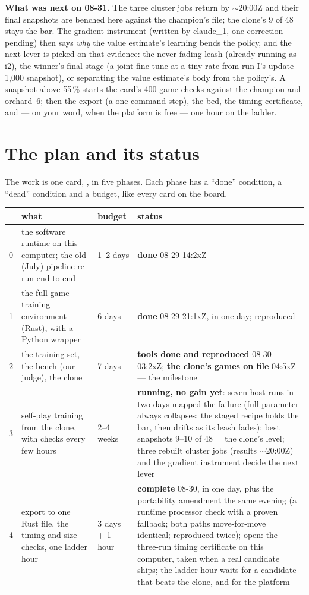 \documentclass[11pt,a4paper]{article}
\newcommand{\fp}[1]{{\small\path{#1}}}
\begin{document}
\textbf{What was next on 08-31.} The three cluster jobs return by $\sim$20:00Z and their final snapshots are benched here against the champion's file; the clone's 9 of 48 stays the bar. The gradient instrument (written by claude\_1, one correction pending) then says \emph{why} the value estimate's learning bends the policy, and the next lever is picked on that evidence: the never-fading leash (already running as i2), the winner's final stage (a joint fine-tune at a tiny rate from run I's update-1,000 snapshot), or separating the value estimate's body from the policy's. A snapshot above 55\,\% starts the card's 400-game checks against the champion and orchard~6; then the export (a one-command step), the bed, the timing certificate, and --- on your word, when the platform is free --- one hour on the ladder.

\section{The plan and its status}

The work is one card, \fp{coordination/tasks/20260829-nn-bot-way-b.md}, in five phases. Each phase has a ``done'' condition, a ``dead'' condition and a budget, like every card on the board.

\begin{center}\small
\begin{tabular}{@{}L{0.5cm}L{6.0cm}L{2.4cm}L{6.3cm}@{}}
\toprule
 & what & budget & status \\
 & the software runtime on this computer; the old (July) pipeline re-run end to end & 1--2 days & \textbf{done} 08-29 14:2xZ \\
1 & the full-game training environment (Rust), with a Python wrapper & 6 days & \textbf{done} 08-29 21:1xZ, in one day; reproduced \\
2 & the training set, the bench (our judge), the clone & 7 days & \textbf{tools done and reproduced} 08-30 03:2xZ; \textbf{the clone's games on file} 04:5xZ --- the milestone \\
3 & self-play training from the clone, with checks every few hours & 2--4 weeks & \textbf{running, no gain yet}: seven host runs in two days mapped the failure (full-parameter always collapses; the staged recipe holds the bar, then drifts as its leash fades); best snapshots 9--10 of 48 = the clone's level; three rebuilt cluster jobs (results $\sim$20:00Z) and the gradient instrument decide the next lever \\
4 & export to one Rust file, the timing and size checks, one ladder hour & 3 days + 1 hour & \textbf{complete} 08-30, in one day, plus the portability amendment the same evening (a runtime processor check with a proven fallback; both paths move-for-move identical; reproduced twice); open: the three-run timing certificate on this computer, taken when a real candidate ships; the ladder hour waits for a candidate that beats the clone, and for the platform \\
\bottomrule
\end{tabular}
\end{center}
\end{document}
